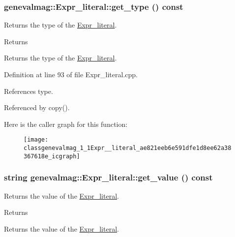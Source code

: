\hypertarget{classgenevalmag_1_1Expr__literal_ae821eeb6e591dfe1d8ee62a38367618e}{
\subsubsection[{get\_\-type}]{ genevalmag::Expr\_\-literal::get\_\-type () const}}
\label{classgenevalmag_1_1Expr__literal_ae821eeb6e591dfe1d8ee62a38367618e}
Returns the type of the \hyperlink{classgenevalmag_1_1Expr__literal}{Expr\_\-literal}. \begin{DoxyReturn}{Returns}

\end{DoxyReturn}
Returns the type of the \hyperlink{classgenevalmag_1_1Expr__literal}{Expr\_\-literal}. 

Definition at line 93 of file Expr\_\-literal.cpp.



References type.



Referenced by copy().



Here is the caller graph for this function:\nopagebreak
\begin{figure}[H]
\begin{center}
\leavevmode
\texttt{[image: classgenevalmag\_1\_1Expr\_\_literal\_ae821eeb6e591dfe1d8ee62a38367618e\_icgraph]}
\end{center}
\end{figure}


\hypertarget{classgenevalmag_1_1Expr__literal_a80638840b211284c6d4b4babbe08ce21}{
\subsubsection[{get\_\-value}]{\setlength{\rightskip}{0pt plus 5cm}string genevalmag::Expr\_\-literal::get\_\-value () const}}
\label{classgenevalmag_1_1Expr__literal_a80638840b211284c6d4b4babbe08ce21}
Returns the value of the \hyperlink{classgenevalmag_1_1Expr__literal}{Expr\_\-literal}. \begin{DoxyReturn}{Returns}

\end{DoxyReturn}
Returns the value of the \hyperlink{classgenevalmag_1_1Expr__literal}{Expr\_\-literal}. 


